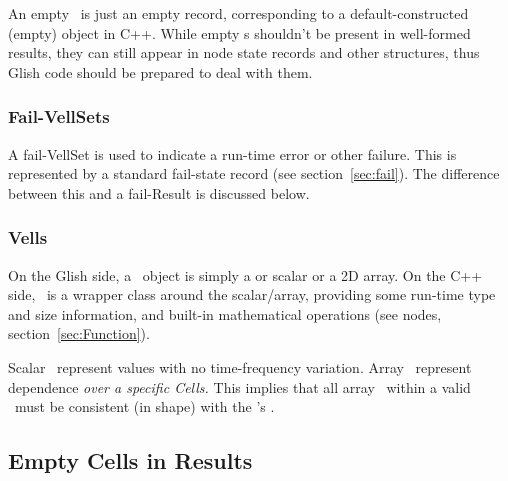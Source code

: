   An empty \VellSet\ is just an empty record, corresponding to a
  default-constructed (empty) object in C++. While empty \VellSet{}s shouldn't
  be present in well-formed results, they can still appear in node state
  records and other structures, thus Glish code should be prepared to deal with
  them.
  
  \subsubsection{Fail-VellSets}

  A fail-VellSet is used to indicate a run-time error or other failure. This
  is represented by a standard fail-state record (see section~\ref{sec:fail}).
  The difference between this and a fail-Result is discussed below.

\subsubsection{Vells}

  On the Glish side, a \Vells\ object is simply a  or 
  scalar or a 2D array. On the C++ side, \Vells\ is a wrapper class around the
  scalar/array, providing some run-time type and size information, and built-in
  mathematical operations (see  nodes,
  section~\ref{sec:Function}).

  Scalar \Vells\ represent values with no time-frequency variation. Array
  \Vells\ represent dependence {\em over a specific Cells.} This implies that
  all array \Vells\ within a valid \Result\ must be consistent (in shape) with
  the \Result's \Cells.

\subsection{Empty Cells in Results}
  \label{sec:result-empty-cells} 
  
